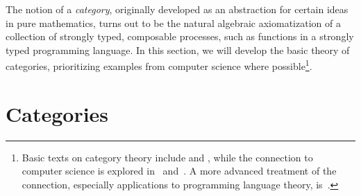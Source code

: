 
The notion of a \emph{category}, originally developed as an abstraction for
certain ideas in pure mathematics, turns out to be the natural algebraic
axiomatization of a collection of strongly typed, composable processes, such as
functions in a strongly typed programming language. In this section, we will
develop the basic theory of categories, prioritizing examples from computer
science where possible\footnote{
  Basic texts on category theory include \cite{maclane-1971} and
  \cite{riehl-2017}, while the connection to computer science is explored
  in~\cite{pierce-1991} and~\cite{barr-wells-1990}. A more advanced treatment of
  the connection, especially applications to programming language theory,
  is~\cite{jacobs-1999}.
}.


\section{Categories}


